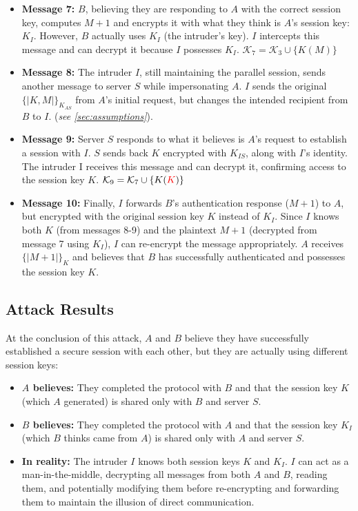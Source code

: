 \documentclass[11pt]{article}
\begin{document}
\begin{itemize}
        \item \textbf{Message 7:} $B$, believing they are responding to $A$ with the correct session key, computes
                $M + 1$ and encrypts it with what they think is $A$'s session key: $K_I$. However, $B$ actually uses $K_I$
                (the intruder's key). $I$ intercepts this message and can decrypt it because $I$ possesses $K_I$. $\mathcal{K}_7 = \mathcal{K}_3 \cup \{K(M)\}$

        \item \textbf{Message 8:} The intruder $I$, still maintaining the parallel session, sends another message to
                server $S$ while impersonating $A$. $I$ sends the original $\{| K, M |\}_{K_{AS}}$ from $A$'s initial request, but
                changes the intended recipient from $B$ to $I$. (\textit{see \ref{sec:assumptions}}).

        \item \textbf{Message 9:} Server $S$ responds to what it believes is $A$'s request to establish a session with
            $I$. $S$ sends back $K$ encrypted with $K_{IS}$, along with $I$'s identity. The intruder I receives this
            message and can decrypt it, confirming access to the session key $K$. $\mathcal{K}_9 = \mathcal{K}_7 \cup \{K(\textcolor{red}{K})\}$

        \item \textbf{Message 10:} Finally, $I$ forwards $B$'s authentication response ($M + 1$) to $A$, but encrypted
                with the original session key $K$ instead of $K_I$. Since $I$ knows both $K$ (from messages 8-9) and
                the plaintext $M + 1$ (decrypted from message 7 using $K_I$), $I$ can re-encrypt the message
                appropriately. $A$ receives $\{|M + 1|\}_{K}$ and believes that $B$ has successfully authenticated and
                possesses the session key $K$.

    \end{itemize}

    \subsection{Attack Results}

    At the conclusion of this attack, $A$ and $B$ believe they have successfully established a secure session with each other, but they are actually using different session keys:
    \begin{itemize}
        \item \textbf{$A$ believes:} They completed the protocol with $B$ and that the session key $K$ (which $A$ generated) is shared only with $B$ and server $S$.
        \item \textbf{$B$ believes:} They completed the protocol with $A$ and that the session key $K_I$ (which $B$ thinks came from $A$) is shared only with $A$ and server $S$.
        \item \textbf{In reality:} The intruder $I$ knows both session keys $K$ and $K_I$. $I$ can act as a man-in-the-middle, decrypting all messages from both $A$ and $B$, reading them, and potentially modifying them before re-encrypting and forwarding them to maintain the illusion of direct communication.
    \end{itemize}
\end{document}
